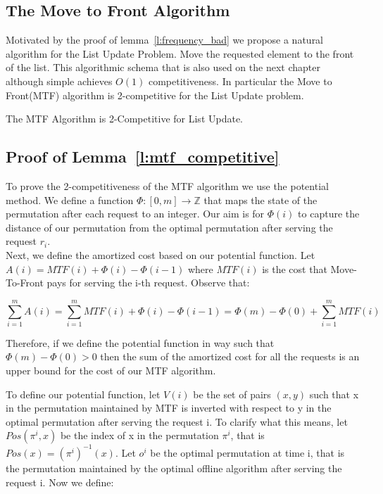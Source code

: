 \subsection{The Move to Front Algorithm}
Motivated by the proof of lemma~\ref{l:frequency_bad} we propose a natural algorithm for the List Update Problem. Move the requested element to the front of the list. This algorithmic schema that is also used on the next chapter although simple achieves $O(1)$ competitiveness. In particular the Move to Front(MTF) algorithm is 2-competitive for the List Update problem.

\begin{lemma}\label{l:mtf_competitive}
    The MTF Algorithm is 2-Competitive for List Update.
\end{lemma}

\subsection{Proof of Lemma~\ref{l:mtf_competitive}}\label{s:proof_mtf}

To prove the 2-competitiveness of the MTF algorithm we use the potential method. We define a function $\Phi: [0, m] \rightarrow \mathbb{Z}$ that maps the state of the permutation after each request to an integer. Our aim is for $\Phi( i )$ to capture the distance of our permutation from the optimal permutation after serving the request $r_i$. \\

Next, we define the amortized cost based on our potential function. Let $A(i) = MTF(i) + \Phi(i) - \Phi(i-1)$ where $MTF(i)$ is the cost that Move-To-Front pays for serving the i-th request. Observe that:

\begin{equation}\label{e:amortized_cost}
    \sum_{i=1}^m A(i) = \sum_{i=1}^m MTF(i) + \Phi(i) - \Phi(i-1) = \Phi(m) - \Phi(0) + \sum_{i=1}^m MTF(i)
\end{equation}

Therefore, if we define the potential function in way such that $\Phi(m) - \Phi(0) > 0$ then the sum of the amortized cost for all the requests is an upper bound for the cost of our MTF algorithm.

To define our potential function, let $V(i)$ be the set of pairs $(x,y)$ such that x in the permutation maintained by MTF is inverted with respect to y in the optimal permutation after serving the request i. To clarify what this means, let $Pos( \pi^i, x)$ be the index of x in the permutation $\pi^i$, that is $Pos(x) = (\pi^i)^{-1}(x)$. Let $o^i$ be the optimal permutation at time i, that is the permutation maintained by the optimal offline algorithm after serving the request i. Now we define:

